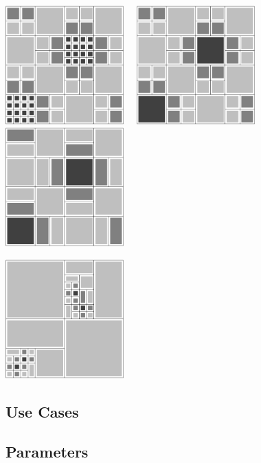 \centerline{\includegraphics[width=1.8in]{amr4-4.pdf} \ \
            \includegraphics[width=1.8in]{amr4-5.pdf} \ \
            \includegraphics[width=1.8in]{amr4-6.pdf}}
\centerline{\includegraphics[width=1.8in]{amr4-7.pdf}}


\subsection{Use Cases}
\subsection{Parameters}
